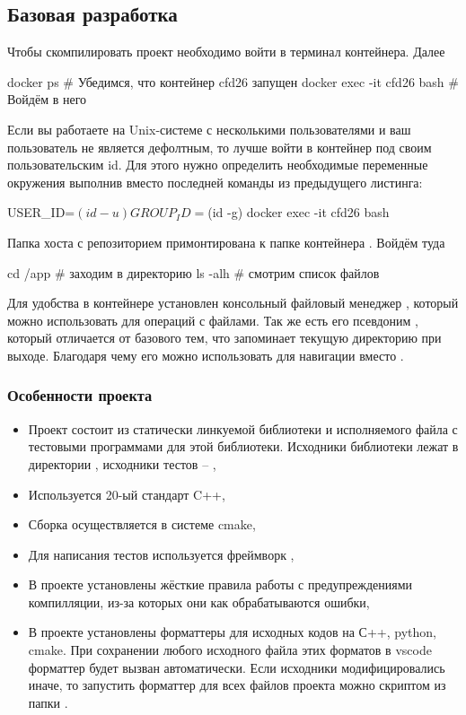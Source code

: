 \subsection{Базовая разработка}
\label{sec:howto_basic_dev}
Чтобы скомпилировать проект необходимо войти в терминал контейнера.
Далее
\begin{shelloutput}
docker ps                   # Убедимся, что контейнер cfd26 запущен
docker exec -it cfd26 bash  # Войдём в него
\end{shelloutput}

Если вы работаете на Unix-системе с несколькими пользователями и ваш пользователь не является дефолтным, то лучше войти в контейнер под
своим пользовательским id. Для этого нужно определить необходимые переменные окружения выполнив вместо последней команды из предыдущего листинга:
\begin{shelloutput}
USER_ID=$(id -u) GROUP_ID=$(id -g) docker exec -it cfd26 bash
\end{shelloutput}

Папка хоста с репозиторием  примонтирована к папке контейнера .
Войдём туда
\begin{shelloutput}
cd /app   # заходим в директорию
ls -alh   # смотрим список файлов
\end{shelloutput}
Для удобства в контейнере установлен консольный файловый менеджер ,
который можно использовать для операций с файлами. Так же есть его псевдоним ,
который отличается от базового  тем, что запоминает текущую директорию при выходе.
Благодаря чему его можно использовать для навигации вместо .


\subsubsection{Особенности проекта}
\begin{itemize}
\item Проект состоит из статически линкуемой библиотеки  и исполняемого файла  с тестовыми программами для этой библиотеки.
      Исходники библиотеки лежат в директории , исходники тестов -- ,
\item Используется 20-ый стандарт C++,
\item Сборка осуществляется в системе cmake,
\item Для написания тестов используется фреймворк ,
\item В проекте установлены жёсткие правила работы с предупреждениями компилляции, из-за которых они как обрабатываются ошибки,
\item В проекте установлены форматтеры для исходных кодов на С++, python, cmake. При сохранении любого исходного файла этих форматов в vscode
      форматтер будет вызван автоматически. Если исходники модифицировались иначе, то запустить форматтер для всех файлов проекта
      можно скриптом  из папки .
\end{itemize}

